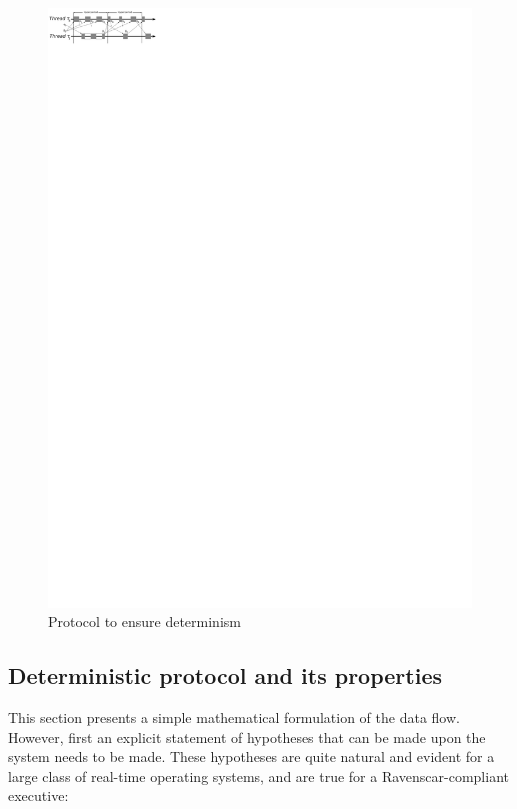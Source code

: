 \begin{figure}
\centering
\includegraphics[scale=1.75]{figs/det_no_breach}
\caption{Protocol to ensure determinism}
\label{fig:determinism}
\end{figure}

\subsection{Deterministic protocol and its properties}
\label{sec:approach}
This section presents a simple mathematical formulation of the data
flow. However, first an explicit statement of hypotheses that can be
made upon the system needs to be made. These hypotheses are quite
natural and evident for a large class of real-time operating systems,
and are true for a Ravenscar-compliant executive:

